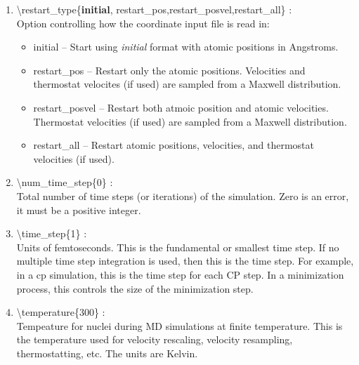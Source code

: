 \documentclass[12pt,titlepage]{article}
\begin{document}
\begin{enumerate}
 \vspace{0.15in} 
 \item  \textbackslash{}restart\_type\{{\bf initial},
             restart\_pos,restart\_posvel,restart\_all\} : \\
     Option controlling how the coordinate input file is read in:
     \begin{itemize}
       \item  initial -- Start using {\it initial} format 
                                        with atomic positions in Angstroms.
       \item  restart\_pos -- Restart only the atomic positions.
                    Velocities and thermostat velocites (if used) are 
                    sampled from a Maxwell distribution.
       \item  restart\_posvel -- Restart both atmoic position 
                     and atomic velocities.  Thermostat velocities (if used) 
                     are sampled from a Maxwell distribution.
       \item restart\_all -- Restart atomic positions, 
                     velocities, and thermostat velocities (if used).
     \end{itemize}



 \vspace{0.15in} 
 \item  \textbackslash{}num\_time\_step\{0\} : \\
Total number of time steps (or iterations) of the simulation.  Zero is
an error, it must be a positive integer.  

 \vspace{0.15in} 
 \item   \textbackslash{}time\_step\{1\} : \\
Units of femtoseconds.  This is the fundamental or smallest time
step. If no multiple time step integration is used, then this is the
time step.  For example, in a cp simulation, this is the time step for
each CP step.  In a minimization process, this controls the size of
the minimization step.


 \vspace{0.15in} 
 \item   \textbackslash{}temperature\{300\} : \\
Tempeature for nuclei during MD simulations at finite temperature.
This is the temperature used for velocity rescaling, velocity
resampling, thermostatting, etc. The units are Kelvin.



\end{enumerate}
\end{document}
